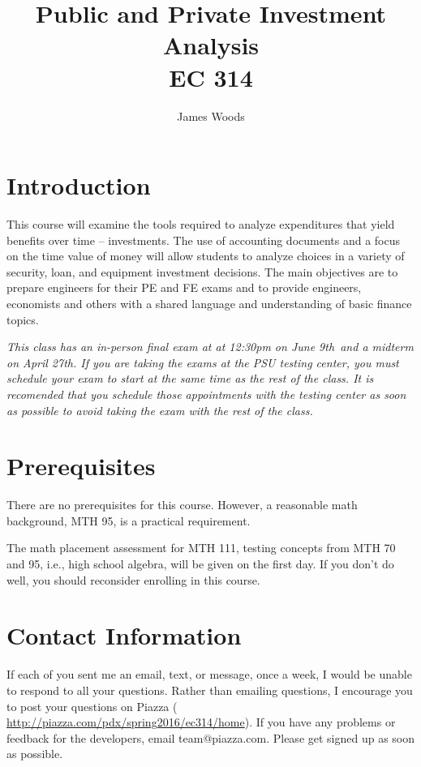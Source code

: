 \documentclass[letterpaper,10pt]{article}
\date{}
\title{Public and Private Investment Analysis\\  
EC 314\\
\Term}
\author{James Woods}
\newif\ifhybrid
\newif\ifonline
\newcommand{\Piazza}{\url{ http://piazza.com/pdx/spring2016/ec314/home}}
\newcommand{\FinalExam}{at 12:30pm  on June 9th}
\newcommand{\MidtermExam}{on April 27th}
\begin{document}
  
\maketitle

\section{Introduction}

This course will examine the tools required to analyze expenditures
that yield benefits over time -- investments. The use of accounting
documents and a focus on the time value of money will allow students
to analyze choices in a variety of security, loan, and equipment
investment decisions. The main objectives are to prepare engineers for their PE and FE exams and to
provide engineers, economists and others with a shared language and
understanding of basic finance topics.


\ifhybrid  \fi
\ifonline  \fi

\emph{This class has an in-person final exam at \FinalExam ~and a midterm \MidtermExam. If you are taking the exams at the PSU testing center, you must schedule your exam to start at the same time as the rest of the class. It is recomended that you schedule those appointments with the testing center as soon as possible to avoid taking the exam with the rest of the class.}

\section{Prerequisites}

There are no prerequisites for this course. However, a reasonable math
background, MTH 95, is a practical requirement. 

\ifonline
  
  \else
    The math placement assessment for MTH 111, testing concepts from MTH 70 and 95, i.e., high school algebra, will be given on the first day.  If you don't do well, you should reconsider enrolling in this course.
\fi

\section{Contact Information}

If each of you sent me an email, text, or message, once a week, I would be unable to respond to all your questions.  Rather than emailing questions, I encourage you to post your questions on Piazza (\Piazza). If you have any problems or feedback for the developers, email team@piazza.com. Please get signed up as soon as possible. 
\end{document}
